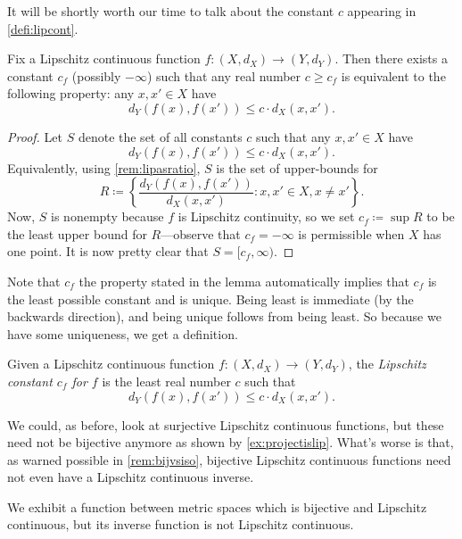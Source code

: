 \documentclass[../notes.tex]{subfiles}
\begin{document}
It will be shortly worth our time to talk about the constant $c$ appearing in \autoref{defi:lipcont}.
\begin{lemma} \label{lem:getlipconst}
	Fix a Lipschitz continuous function $f\colon(X,d_X)\to(Y,d_Y)$. Then there exists a constant $c_f$ (possibly $-\infty$) such that any real number $c\ge c_f$ is equivalent to the following property: any $x,x'\in X$ have
	\[d_Y(f(x),f(x'))\le c\cdot d_X(x,x').\]
\end{lemma}
\begin{proof}
	Let $S$ denote the set of all constants $c$ such that any $x,x'\in X$ have
	\[d_Y(f(x),f(x'))\le c\cdot d_X(x,x').\]
	Equivalently, using \autoref{rem:lipasratio}, $S$ is the set of upper-bounds for
	\[R\coloneqq\left\{\frac{d_Y(f(x),f(x'))}{d_X(x,x')}:x,x'\in X,x\ne x'\right\}.\]
	Now, $S$ is nonempty because $f$ is Lipschitz continuity, so we set $c_f\coloneqq\sup R$ to be the least upper bound for $R$---observe that $c_f=-\infty$ is permissible when $X$ has one point. It is now pretty clear that $S=[c_f,\infty)$.
\end{proof}
Note that $c_f$ the property stated in the lemma automatically implies that $c_f$ is the least possible constant and is unique. Being least is immediate (by the backwards direction), and being unique follows from being least. So because we have some uniqueness, we get a definition.
\begin{defihelper} 
	Given a Lipschitz continuous function $f\colon(X,d_X)\to(Y,d_Y)$, the \textit{Lipschitz constant $c_f$ for $f$} is the least real number $c$ such that
	\[d_Y(f(x),f(x'))\le c\cdot d_X(x,x').\]
\end{defihelper}
We could, as before, look at surjective Lipschitz continuous functions, but these need not be bijective anymore as shown by \autoref{ex:projectislip}. What's worse is that, as warned possible in \autoref{rem:bijvsiso}, bijective Lipschitz continuous functions need not even have a Lipschitz continuous inverse.
\begin{exe} \label{exe:sadbijlip}
	We exhibit a function between metric spaces which is bijective and Lipschitz continuous, but its inverse function is not Lipschitz continuous.
\end{exe}
\end{document}
